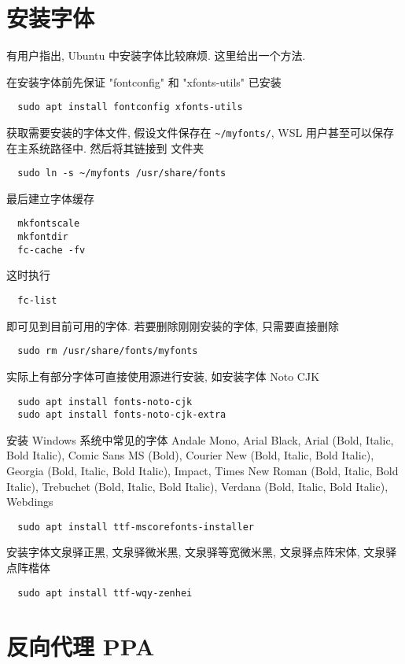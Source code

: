 \section{安装字体}\label{sec:addition:font}

有用户指出,
Ubuntu 中安装字体比较麻烦.
这里给出一个方法.

在安装字体前先保证 "fontconfig" 和 "xfonts-utils" 已安装
\begin{lstlisting}
  sudo apt install fontconfig xfonts-utils
\end{lstlisting}
获取需要安装的字体文件,
假设文件保存在 \verb|~/myfonts/|,
WSL 用户甚至可以保存在主系统路径中.
然后将其链接到  文件夹
\begin{lstlisting}
  sudo ln -s ~/myfonts /usr/share/fonts
\end{lstlisting}
最后建立字体缓存
\begin{lstlisting}
  mkfontscale
  mkfontdir
  fc-cache -fv
\end{lstlisting}
这时执行
\begin{lstlisting}
  fc-list
\end{lstlisting}
即可见到目前可用的字体.
若要删除刚刚安装的字体,
只需要直接删除
\begin{lstlisting}
  sudo rm /usr/share/fonts/myfonts
\end{lstlisting}

实际上有部分字体可直接使用源进行安装,
如安装字体 Noto CJK
\begin{lstlisting}
  sudo apt install fonts-noto-cjk
  sudo apt install fonts-noto-cjk-extra
\end{lstlisting}
安装 Windows 系统中常见的字体 Andale Mono,
Arial Black,
Arial (Bold, Italic, Bold Italic),
Comic Sans MS (Bold),
Courier New (Bold, Italic, Bold Italic),
Georgia (Bold, Italic, Bold Italic),
Impact,
Times New Roman (Bold, Italic, Bold Italic),
Trebuchet (Bold, Italic, Bold Italic),
Verdana (Bold, Italic, Bold Italic),
Webdings
\begin{lstlisting}
  sudo apt install ttf-mscorefonts-installer
\end{lstlisting}
安装字体文泉驿正黑,
文泉驿微米黑,
文泉驿等宽微米黑,
文泉驿点阵宋体,
文泉驿点阵楷体
\begin{lstlisting}
  sudo apt install ttf-wqy-zenhei
\end{lstlisting}

\section{反向代理 PPA}\label{sec:addition:proxy}


